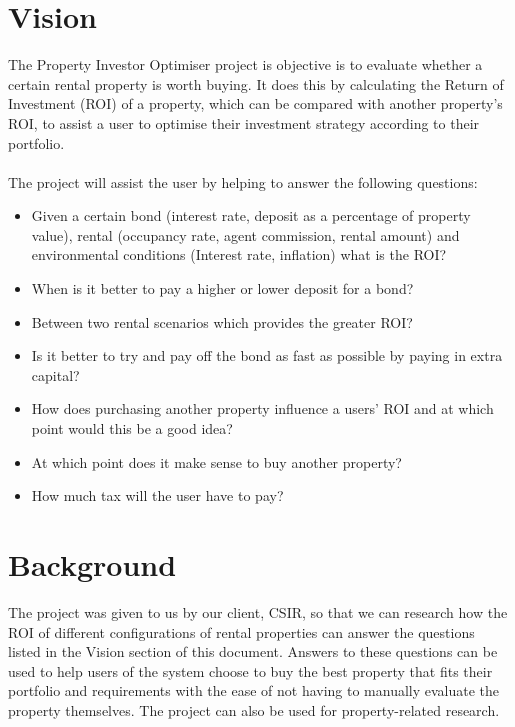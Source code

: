 \documentclass[a4paper,12pt]{article}
\begin{document}
\section{Vision}
The Property Investor Optimiser project is objective is to evaluate whether a certain rental property is worth buying. It does this by calculating the Return of Investment (ROI) of a property, which can be compared with another property's ROI, to assist a user to optimise their investment strategy according to their portfolio.\\\\
The project will assist the user by helping to answer the following questions:\begin{itemize}
	\item Given a certain bond (interest rate, deposit as a percentage of property value), rental (occupancy rate, agent commission, rental amount) and environmental conditions (Interest rate, inflation) what is the ROI?
	\item When is it better to pay a higher or lower deposit for a bond?
	\item Between two rental scenarios which provides the greater ROI?
	\item Is it better to try and pay off the bond as fast as possible by paying in extra capital?
	\item How does purchasing another property influence a users’ ROI and at which point would this be a good idea?
	\item At which point does it make sense to buy another property?
	\item How much tax will the user have to pay?

\end{itemize}
\newpage
\section{Background}
The project was given to us by our client, CSIR, so that we can research how the ROI of different configurations of rental properties can answer the questions listed in the Vision section of this document. Answers to these questions can be used to help users of the system choose to buy the best property that fits their portfolio and requirements with the ease of not having to manually evaluate the property themselves. The project can also be used for property-related research.

\end{document}
